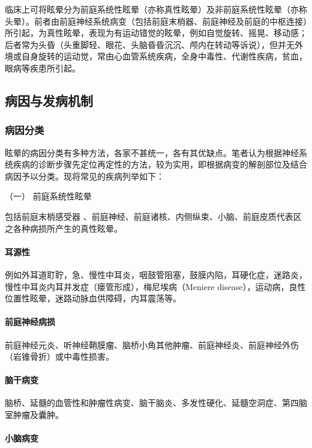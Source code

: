 临床上可将眩晕分为前庭系统性眩晕（亦称真性眩晕）及非前庭系统性眩晕（亦称头晕）。前者由前庭神经系统病变（包括前庭末梢器、前庭神经及前庭的中枢连接）所引起，为真性眩晕，表现为有运动错觉的眩晕，例如自觉旋转、摇晃、移动感；后者常为头昏（头重脚轻、眼花、头脑昏昏沉沉、颅内在转动等诉说），但并无外境或自身旋转的运动觉，常由心血管系统疾病，全身中毒性、代谢性疾病，贫血，眼病等疾患所引起。

\subsection{病因与发病机制}

\subsubsection{病因分类}

眩晕的病因分类有多种方法，各家不甚统一，各有其优缺点。笔者认为根据神经系统疾病的诊断步骤先定位再定性的方法，较为实用，即根据病变的解剖部位及结合病因予以分类。现将常见的疾病列举如下：

\hypertarget{text00012.htmlux5cux23CHP1-3-1-1-1}{}
（一） 前庭系统性眩晕

包括前庭末梢感受器
、前庭神经、前庭诸核、内侧纵束、小脑、前庭皮质代表区之各种病损所产生的真性眩晕。

\paragraph{耳源性}

例如外耳道耵聍，急、慢性中耳炎，咽鼓管阻塞，鼓膜内陷，耳硬化症，迷路炎，慢性中耳炎内耳并发症（瘘管形成），梅尼埃病（Meniere
disease），运动病，良性位置性眩晕，迷路动脉血供障碍，内耳震荡等。

\paragraph{前庭神经病损}

前庭神经元炎、听神经鞘膜瘤、脑桥小角其他肿瘤、前庭神经炎、前庭神经外伤（岩锥骨折）或中毒性损害。

\paragraph{脑干病变}

脑桥、延髓的血管性和肿瘤性病变、脑干脑炎、多发性硬化、延髓空洞症、第四脑室肿瘤及囊肿。

\paragraph{小脑病变}

